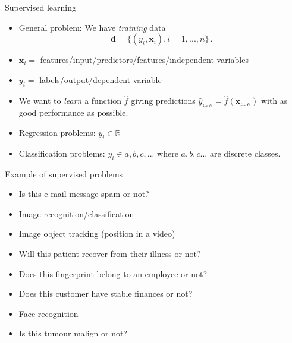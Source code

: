 \documentclass[10pt]{beamer}
\begin{document}
\begin{frame}{Supervised learning}

\begin{itemize}
\item General problem: We have \emph{training} data
\[
\mathbf{d} = \{(y_i, \mathbf{x}_i), i = 1, ..., n\} \,.
\]
\item $\mathbf{x}_i = $ features/input/predictors/features/independent variables
\item $y_i = $ labels/output/dependent variable
\item We want to \emph{learn} a function $\hat{f}$ giving predictions $\hat{y}_{\mathrm{new}} = \hat{f}(\mathbf{x}_{\mathrm{new}})$ with as good performance as possible.\pause
\item Regression problems: $y_i \in \mathbb{R}$
\item Classification problems: $y_i \in {a,b,c,...}$ where $a,b,c ...$ are discrete classes.
\end{itemize}

\end{frame}



\begin{frame}{Example of supervised problems}



\pause

\begin{itemize}
\item Is this e-mail message spam or not?\pause
\item Image recognition/classification\pause
\item Image object tracking (position in a video)\pause
\item Will this patient recover from their illness or not?\pause
\item Does this fingerprint belong to an employee or not?\pause
\item Does this customer have stable finances or not?\pause
\item Face recognition\pause
\item Is this tumour malign or not?\pause
\end{itemize}

\end{frame}
\end{document}
